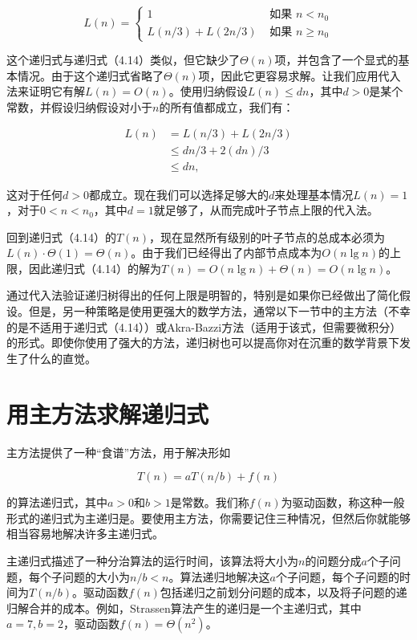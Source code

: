 \documentclass[lang=cn,newtx,10pt,scheme=chinese]{elegantbook}
\begin{document}
\begin{equation}
L(n)= \begin{cases}1 & \text { 如果 } n<n_0 \\ L(n / 3)+L(2 n / 3) & \text { 如果 } n \geq n_0\end{cases}
\end{equation}

这个递归式与递归式（4.14）类似，但它缺少了$\Theta(n)$项，并包含了一个显式的基本情况。由于这个递归式省略了$\Theta(n)$项，因此它更容易求解。让我们应用代入法来证明它有解$L(n)=O(n)$。使用归纳假设$L(n) \leq d n$，其中$d>0$是某个常数，并假设归纳假设对小于$n$的所有值都成立，我们有：

$$
\begin{aligned}
L(n) & =L(n / 3)+L(2 n / 3) \\
& \leq d n / 3+2(d n) / 3 \\
& \leq d n,
\end{aligned}
$$

这对于任何$d>0$都成立。现在我们可以选择足够大的$d$来处理基本情况$L(n)=1$，对于$0<n<n_0$，其中$d=1$就足够了，从而完成叶子节点上限的代入法。

回到递归式（4.14）的$T(n)$，现在显然所有级别的叶子节点的总成本必须为$L(n) \cdot \Theta(1)=\Theta(n)$。由于我们已经得出了内部节点成本为$O(n \lg n)$的上限，因此递归式（4.14）的解为$T(n)=O(n \lg n)+\Theta(n)=O(n \lg n)$。

通过代入法验证递归树得出的任何上限是明智的，特别是如果你已经做出了简化假设。但是，另一种策略是使用更强大的数学方法，通常以下一节中的主方法（不幸的是不适用于递归式（4.14））或Akra-Bazzi方法（适用于该式，但需要微积分）的形式。即使你使用了强大的方法，递归树也可以提高你对在沉重的数学背景下发生了什么的直觉。

\section{用主方法求解递归式}\label{section-4.5}

主方法提供了一种“食谱”方法，用于解决形如

\begin{equation}
T(n)=aT(n/b)+f(n)
\end{equation}

的算法递归式，其中$a>0$和$b>1$是常数。我们称$f(n)$为驱动函数，称这种一般形式的递归式为主递归是。要使用主方法，你需要记住三种情况，但然后你就能够相当容易地解决许多主递归式。

主递归式描述了一种分治算法的运行时间，该算法将大小为$n$的问题分成$a$个子问题，每个子问题的大小为$n / b<n$。算法递归地解决这$a$个子问题，每个子问题的时间为$T(n / b)$。驱动函数$f(n)$包括递归之前划分问题的成本，以及将子问题的递归解合并的成本。例如，Strassen算法产生的递归是一个主递归式，其中$a=7, b=2$，驱动函数$f(n)=\Theta(n^2)$。
\end{document}
